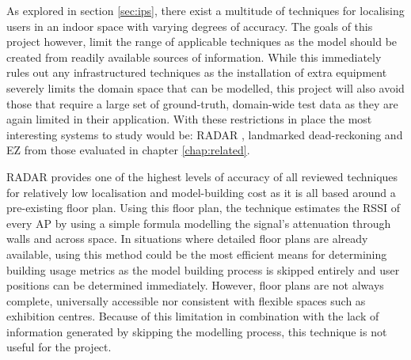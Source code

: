 \documentclass{UoYCSproject}
\begin{document}
        As explored in section \ref{sec:ips}, there exist a multitude of techniques for localising users in an indoor space with varying degrees of accuracy. The goals of this project however, limit the range of applicable techniques as the model should be created from readily available sources of information. While this immediately rules out any infrastructured techniques as the installation of extra equipment severely limits the domain space that can be modelled, this project will also avoid those that require a large set of ground-truth, domain-wide test data as they are again limited in their application. With these restrictions in place the most interesting systems to study would be: RADAR \citep{bahl2000radar}, landmarked dead-reckoning \citep{wang2012no} and EZ \citep{chintalapudi2010indoor} from those evaluated in chapter \ref{chap:related}.
        
        RADAR provides one of the highest levels of accuracy of all reviewed techniques for relatively low localisation and model-building cost as it is all based around a pre-existing floor plan. Using this floor plan, the technique estimates the RSSI of every AP by using a simple formula modelling the signal's attenuation through walls and across space. In situations where detailed floor plans are already available, using this method could be the most efficient means for determining building usage metrics as the model building process is skipped entirely and user positions can be determined immediately. However, floor plans are not always complete, universally accessible nor consistent with flexible spaces such as exhibition centres. Because of this limitation in combination with the lack of information generated by skipping the modelling process, this technique is not useful for the project.
        
\end{document}
